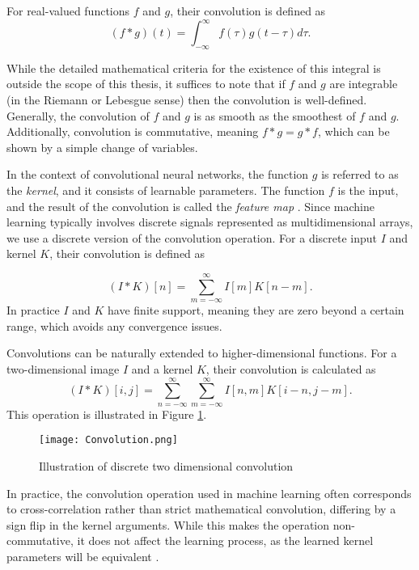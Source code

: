 \documentclass[../../thesis.tex]{subfiles}
\begin{document}
For real-valued functions $f$ and $g$, their convolution is defined as
\begin{equation}
    (f*g)(t) = \int_{-\infty}^{\infty} f(\tau)g(t-\tau) d\tau.
\end{equation}

While the detailed mathematical criteria for the existence of this integral is outside the scope of this thesis, it suffices to note that if $f$ and $g$ are integrable (in the Riemann or Lebesgue sense) then the convolution is well-defined. Generally, the convolution of $f$ and $g$ is as smooth as the smoothest of $f$ and $g$. Additionally, convolution is commutative, meaning $f*g = g*f$, which can be shown by a simple change of variables. \newline

In the context of convolutional neural networks, the function $g$ is referred to as the \textit{kernel}, and it consists of learnable parameters. The function $f$ is the input, and the result of the convolution is called the \textit{feature map} \cite{deeplearningbook}. Since machine learning typically involves discrete signals represented as multidimensional arrays, we use a discrete version of the convolution operation. For a discrete input $I$ and kernel $K$, their convolution is defined as

\begin{equation}
    (I*K)[n] = \sum_{m=-\infty}^{\infty} I[m]K[n-m].
\end{equation}
In practice $I$ and $K$ have finite support, meaning they are zero beyond a certain range, which avoids any convergence issues.\newline

Convolutions can be naturally extended to higher-dimensional functions. For a two-dimensional image $I$ and a kernel $K$, their convolution is calculated as 
\begin{equation}
    (I*K)[i,j] = \sum_{n=-\infty}^{\infty}\sum_{m=-\infty}^{\infty} I[n,m]K[i - n,j - m]. 
\end{equation}
This operation is illustrated in Figure \ref{fig:Convolution}.\newline

\begin{figure}[h]
    \texttt{[image: Convolution.png]}
    \centering    
    \caption{Illustration of discrete two dimensional convolution}
    \label{fig:Convolution}
\end{figure}

In practice, the convolution operation used in machine learning often corresponds to cross-correlation rather than strict mathematical convolution, differing by a sign flip in the kernel arguments. While this makes the operation non-commutative, it does not affect the learning process, as the learned kernel parameters will be equivalent \cite{deeplearningbook}.\newline
\end{document}
